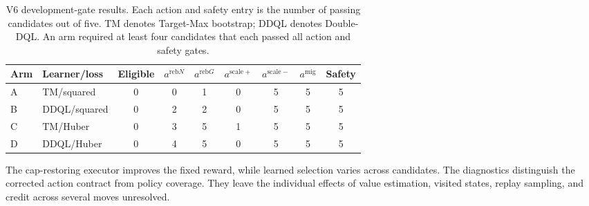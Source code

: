 \begin{table}[t]
  \caption{V6 development-gate results. Each action and safety entry is the
  number of passing candidates out of five. TM denotes Target-Max bootstrap;
  DDQL denotes Double-DQL. An arm required at least four candidates that each
  passed all action and safety gates.}
  \label{tab:v6-factorial-coverage}
  \centering
  \small
  \setlength{\tabcolsep}{3pt}
  \begin{tabular}{llccccccc}
    \toprule
    Arm & Learner/loss & Eligible & $a^{\mathrm{reb}N}$ & $a^{\mathrm{reb}G}$ & $a^{\mathrm{scale}+}$ & $a^{\mathrm{scale}-}$ & $a^{\mathrm{mig}}$ & Safety \\
    \midrule
    A & TM/squared & 0 & 0 & 1 & 0 & 5 & 5 & 5 \\
    B & DDQL/squared & 0 & 2 & 2 & 0 & 5 & 5 & 5 \\
    C & TM/Huber & 0 & 3 & 5 & 1 & 5 & 5 & 5 \\
    D & DDQL/Huber & 0 & 4 & 5 & 0 & 5 & 5 & 5 \\
    \bottomrule
  \end{tabular}
\end{table}

\FloatBarrier
The cap-restoring executor improves the fixed reward, while learned selection
varies across candidates. The diagnostics distinguish the corrected action
contract from policy coverage. They leave the individual effects of value
estimation, visited states, replay sampling, and credit across several moves
unresolved.
